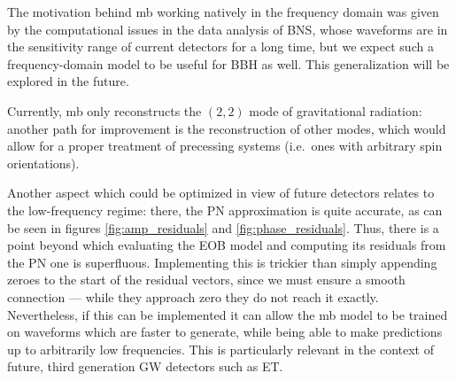 \documentclass[main.tex]{subfiles}
\begin{document}
The motivation behind \ac{mb} working natively in the frequency domain was given by the computational issues in the data analysis of \ac{BNS}, whose waveforms are in the sensitivity range of current detectors for a long time, but we expect such a frequency-domain model to be useful for \ac{BBH} as well. This generalization will be explored in the future.

Currently, \ac{mb} only reconstructs the \((2, 2)\) mode of gravitational radiation: another path for improvement is the reconstruction of other modes, which would allow for a proper treatment of precessing systems (i.e.\ ones with arbitrary spin orientations). 

Another aspect which could be optimized in view of future detectors relates to the low-frequency regime: there, the \ac{PN} approximation is quite accurate, as can be seen in figures \ref{fig:amp_residuals} and \ref{fig:phase_residuals}. 
Thus, there is a point beyond which evaluating the \ac{EOB} model and computing its residuals from the \ac{PN} one is superfluous. 
Implementing this is trickier than simply appending zeroes to the start of the residual vectors, since we must ensure a smooth connection --- while they approach zero they do not reach it exactly. 
Nevertheless, if this can be implemented it can allow the \ac{mb} model to be trained on waveforms which are faster to generate, while being able to make predictions up to arbitrarily low frequencies.
This is particularly relevant in the context of future, third generation \ac{GW} detectors such as \ac{ET}.

\end{document}
